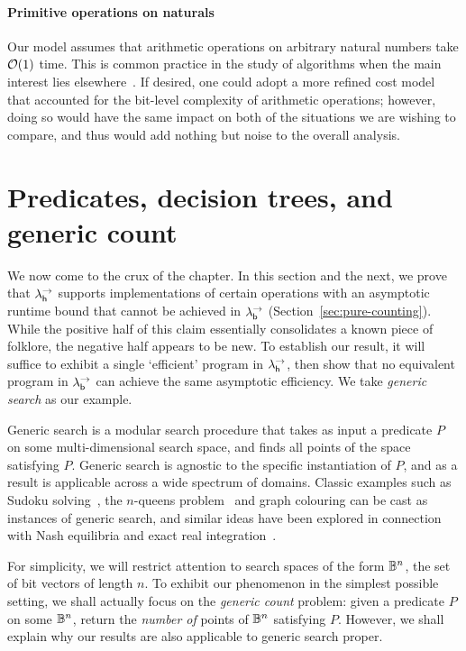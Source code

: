 \documentclass[12pt,phd,lfcs,twoside,openright,logo,leftchapter,normalheadings]{infthesis}
\theoremstyle{plain}
\theoremstyle{definition}
\begin{document}
\paragraph{Primitive operations on naturals}
%
Our model assumes that arithmetic operations on arbitrary natural
numbers take $\mathcal{O}(1)$ time. This is common practice in the study of
algorithms when the main interest lies
elsewhere~\citep[Section~2.2]{CormenLRS09}. If desired, one could
adopt a more refined cost model that accounted for the bit-level
complexity of arithmetic operations; however, doing so would have the
same impact on both of the situations we are wishing to compare, and
thus would add nothing but noise to the overall analysis.


\section{Predicates, decision trees, and generic count}
\label{sec:generic-search}

We now come to the crux of the chapter. In this section and the next, we
prove that $\lambda^\rightarrow_{\mathsf{h}}$ supports implementations of certain operations
with an asymptotic runtime bound that cannot be achieved in $\lambda^\rightarrow_{\mathsf{b}}$
(Section~\ref{sec:pure-counting}).
%
While the positive half of this claim essentially consolidates a
known piece of folklore, the negative half appears to be new.
%
To establish our result, it will suffice to exhibit a single
`efficient' program in $\lambda^\rightarrow_{\mathsf{h}}$, then show that no equivalent program
in $\lambda^\rightarrow_{\mathsf{b}}$ can achieve the same asymptotic efficiency.  We take
\emph{generic search} as our example.

Generic search is a modular search procedure that takes as input
a predicate $P$ on some multi-dimensional search space,
and finds all points of the space satisfying $P$.
Generic search is agnostic to the specific instantiation of $P$,
and as a result is applicable across a wide spectrum of domains.
Classic examples such as Sudoku solving~\citep{Bird06}, the
$n$-queens problem~\citep{BellS09} and graph colouring
can be cast as instances of generic search, and similar ideas have
been explored in connection with Nash equilibria and
exact real integration~\citep{Simpson98, Daniels16}.

For simplicity, we will restrict attention to search spaces of the form $\mathbb{B}^n$,
the set of bit vectors of length $n$.
To exhibit our phenomenon in the simplest
possible setting, we shall actually focus on the \emph{generic count} problem:
given a predicate $P$ on some $\mathbb{B}^n$, return the \emph{number of} points
of $\mathbb{B}^n$ satisfying $P$. However, we shall explain why our results
are also applicable to generic search proper.
\end{document}
